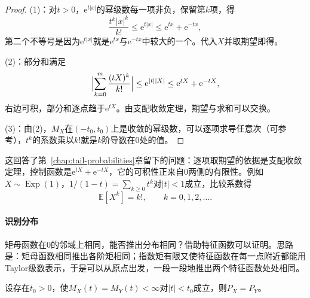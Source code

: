 \begin{proof}
(1)：对$t>0$，$\mathrm{e}^{t\lvert x\rvert}$的幂级数每一项非负，保留第$k$项，得
\[
 \frac{t^{k}\lvert x\rvert^{k}}{k!}\leq\mathrm{e}^{t\lvert x\rvert}\leq\mathrm{e}^{tx}+\mathrm{e}^{-tx} ,
\]
第二个不等号是因为$\mathrm{e}^{t\lvert x\rvert}$就是$\mathrm{e}^{tx}$与$\mathrm{e}^{-tx}$中较大的一个。代入$X$并取期望即得。

(2)：部分和满足
\[
 \Bigl\lvert\sum_{k=0}^{m}\frac{(tX)^{k}}{k!}\Bigr\rvert\leq\mathrm{e}^{\lvert t\rvert\lvert X\rvert}\leq\mathrm{e}^{tX}+\mathrm{e}^{-tX} ,
\]
右边可积，部分和逐点趋于$\mathrm{e}^{tX}$。由支配收敛定理，期望与求和可以交换。

(3)：由(2)，$M_X$在$(-t_0,t_0)$上是收敛的幂级数，可以逐项求导任意次（可参考），$t^{k}$的系数乘以$k!$就是$k$阶导数在$0$处的值。
\end{proof}

这回答了第~\ref{chap:tail-probabilities}章留下的问题：逐项取期望的依据是支配收敛定理，控制函数是$\mathrm{e}^{tX}+\mathrm{e}^{-tX}$，它的可积性正来自$0$两侧的有限性。例如$X\sim\operatorname{Exp}(1)$，$1/(1-t)=\sum_{k\geq0}t^{k}$对$\lvert t\rvert<1$成立，比较系数得
\[
 \mathbb{E}[X^{k}]=k!,\qquad k=0,1,2,\dots .
\]

\paragraph{识别分布}
矩母函数在$0$的邻域上相同，能否推出分布相同？借助特征函数可以证明。思路是：矩母函数相同推出各阶矩相同；指数矩有限又使特征函数在每一点附近都能用Taylor级数表示，于是可以从原点出发，一段一段地推出两个特征函数处处相同。

\begin{theorem}[矩母函数确定分布]
\label{thm:weak-mgf-uniqueness}
设存在$t_0>0$，使$M_X(t)=M_Y(t)<\infty$对$\lvert t\rvert<t_0$成立，则$P_X=P_Y$。
\end{theorem}

